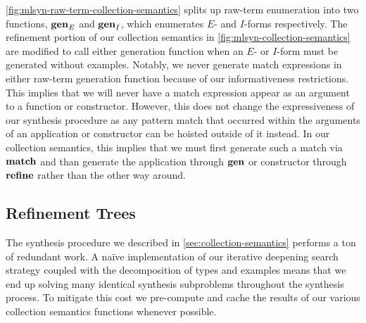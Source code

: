 

\autoref{fig:mlsyn-raw-term-collection-semantics} splits up raw-term enumeration into two functions, $\mathbf{gen}_E$ and $\mathbf{gen}_I$, which enumerates $E$- and $I$-forms respectively.
The refinement portion of our collection semantics in \autoref{fig:mlsyn-collection-semantics} are modified to call either generation function when an $E$- or $I$-form must be generated without examples.
Notably, we never generate match expressions in either raw-term generation function because of our informativeness restrictions.
This implies that we will never have a match expression appear as an argument to a function or constructor.
However, this does not change the expressiveness of our synthesis procedure as any pattern match that occurred within the arguments of an application or constructor can be hoisted outside of it instead.
In our collection semantics, this implies that we must first generate such a match via $\mathbf{match}$ and than generate the application through $\mathbf{gen}$ or constructor through $\mathbf{refine}$ rather than the other way around.

\subsection{Refinement Trees}
\label{subsec:refinement-trees}

The synthesis procedure we described in \autoref{sec:collection-semantics} performs a ton of redundant work.
A na\"{i}ve implementation of our iterative deepening search strategy coupled with the decomposition of types and examples means that we end up solving many identical synthesis subproblems throughout the synthesis process.
To mitigate this cost we pre-compute and cache the results of our various collection semantics functions whenever possible.

